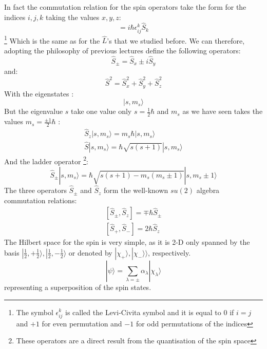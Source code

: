 In fact the commutation relation for the spin operators take the form  for the indices $ i,j,k$ taking the values $ x,y,z$:
\begin{equation}
[ \hat S_i\hat S_j] = i \hbar \epsilon_{ij}^k \hat S_k
\end{equation}
\footnote{The symbol $\epsilon_{ij}^k $ is called the Levi-Civita symbol and it is equal to $0$ if $i=j$ and $+1$ for even permutation and $-1$ for odd permutations of the indices }
Which is the same as for the $\hat L$'s that we studied before.  We can therefore, adopting the philosophy of previous lectures define the following operators:
\begin{equation}
\hat S_\pm = \hat S_x \pm i \hat S_y
\end{equation}
and:
\begin{equation}
\hat S^2= \hat S_x ^2 +\hat S_y ^2+\hat S_z ^2
\end{equation}
With the eigenstates :
\begin{equation}
| s, m_s\rangle
\end{equation}
But the eigenvalue $s$ take one value only $ s= \frac{1}{2} \hbar$ and $ m_s$ as we have seen takes the values $m_s = \frac{\pm1}{2} \hbar $ :
\begin{equation}
\begin{matrix}
\hat S_z | s,m_s\rangle = m_s \hbar |s,m_s\rangle \\ \hat S | s,m_s\rangle = \hbar \sqrt{s(s+1)}|s,m_s\rangle
\end{matrix}
\end{equation}
And the ladder operator \footnote{These operators are a direct result from the quantisation of the spin space }:
\begin{equation}
\hat S_\pm |s,m_{s}\rangle = \hbar\sqrt{s(s+1)-m_{s}(m_{s}\pm 1)} |s,m_{s}\pm 1 \rangle
\end{equation}
The three operators $ \hat S_\pm $ and $ \hat S_z$ form the well-known $su(2)$ algebra commutation relations:
\begin{equation}
\begin{matrix}
[\hat S_\pm , \hat S_z] = \mp \hbar \hat S_\pm \\
[\hat S_+ , \hat S_-] = 2 \hbar \hat S_z
\end{matrix}
\end{equation}
The Hilbert space for the spin is very simple, as it is 2-D only spanned by the basis $ | \frac{1}{2}, +\frac{1}{2} \rangle , | \frac{1}{2}, -\frac{1}{2} \rangle$ or denoted by $ |\chi_+\rangle, |\chi_-\rangle\rangle$, respectively.
\begin{equation}
| \psi \rangle = \sum _{ \lambda = \pm} \alpha_ \lambda |\chi_\lambda\rangle
\end{equation}
representing a superposition of the spin states. 
